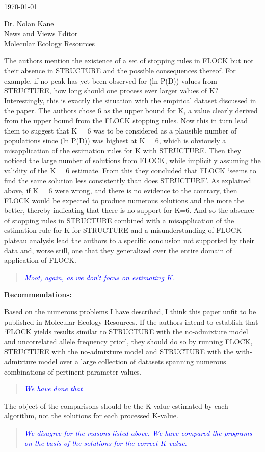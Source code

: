 \documentclass[11pt]{letter}
\newcommand{\reply}[1]{\begin{quotation}\small\sl\textcolor{blue}{#1}\end{quotation}}
\begin{document}
\begin{letter}{ \today 

Dr. Nolan Kane\\
News and Views Editor\\
Molecular Ecology Resources \\
}
The authors mention the existence of a set of stopping rules in FLOCK but not their absence in STRUCTURE and the possible consequences thereof. For example, if no peak has yet been observed for (ln P(D)) values from STRUCTURE, how long should one process ever larger values of K? Interestingly, this is exactly the situation with the empirical dataset discussed in the paper. The authors chose 6 as the upper bound for K, a value clearly derived from the upper bound from the FLOCK stopping rules. Now this in turn lead them to suggest that K = 6 was to be considered as a plausible number of populations since (ln P(D)) was highest at K = 6, which is obviously a misapplication of the estimation rules for K with STRUCTURE. Then they noticed the large number of solutions from FLOCK, while implicitly assuming the validity of the K = 6 estimate. From this they concluded that FLOCK `seems to find the same solution less consistently than does STRUCTURE'. As explained above, if K = 6 were wrong, and there is no evidence to the contrary, then FLOCK would be expected to produce numerous solutions and the more the better, thereby indicating that there is no support for K=6. And so the absence of stopping rules in STRUCTURE combined with a misapplication of the estimation rule for K for STRUCTURE and a misunderstanding of FLOCK plateau analysis lead the authors to a specific conclusion not supported by their data and, worse still, one that they generalized over the entire domain of application of FLOCK.

\reply{Moot, again, as we don't focus on estimating $K$.}

{\bf Recommendations:}

Based on the numerous problems I have described, I think this paper unfit to be published in Molecular Ecology Resources. If the authors intend to establish that `FLOCK yields results similar to STRUCTURE with the no-admixture model and uncorrelated allele frequency prior', they should do so by running FLOCK, STRUCTURE with the no-admixture model and STRUCTURE with the with-admixture model over a large collection of datasets spanning numerous combinations of pertinent parameter values. 

\reply{We have done that}

The object of the comparisons should be the K-value estimated by each algorithm, not the solutions for each processed K-value. 

\reply{We disagree for the reasons listed above.  We have compared the programs on the basis of the
solutions for the {\em correct} $K$-value.}


\end{letter}
\end{document}
